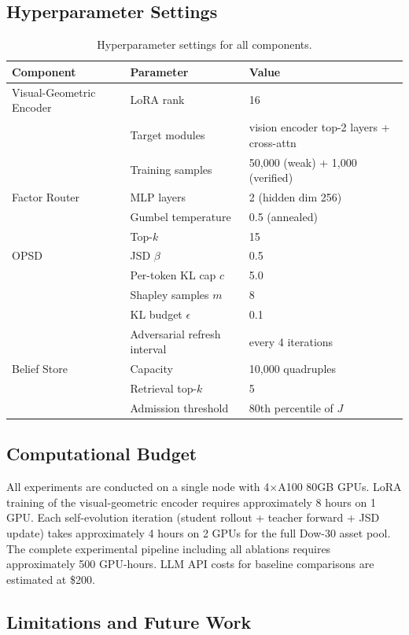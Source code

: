 \subsection{Hyperparameter Settings}

\begin{table}[h]
\centering
\small
\begin{tabular}{lll}
\toprule
Component & Parameter & Value \\
\midrule
Visual-Geometric Encoder & LoRA rank & 16 \\
 & Target modules & vision encoder top-2 layers + cross-attn \\
 & Training samples & 50,000 (weak) + 1,000 (verified) \\
Factor Router & MLP layers & 2 (hidden dim 256) \\
 & Gumbel temperature & 0.5 (annealed) \\
 & Top-$k$ & 15 \\
OPSD & JSD $\beta$ & 0.5 \\
 & Per-token KL cap $c$ & 5.0 \\
 & Shapley samples $m$ & 8 \\
 & KL budget $\epsilon$ & 0.1 \\
 & Adversarial refresh interval & every 4 iterations \\
Belief Store & Capacity & 10,000 quadruples \\
 & Retrieval top-$k$ & 5 \\
 & Admission threshold & 80th percentile of $J$ \\
\bottomrule
\end{tabular}
\caption{Hyperparameter settings for all components.}
\label{tab:hyperparams}
\end{table}

\subsection{Computational Budget}

All experiments are conducted on a single node with 4$\times$A100 80GB GPUs. LoRA training of the visual-geometric encoder requires approximately 8 hours on 1 GPU. Each self-evolution iteration (student rollout + teacher forward + JSD update) takes approximately 4 hours on 2 GPUs for the full Dow-30 asset pool. The complete experimental pipeline including all ablations requires approximately 500 GPU-hours. LLM API costs for baseline comparisons are estimated at \$200.

\subsection{Limitations and Future Work}
\label{sec:limitations}

